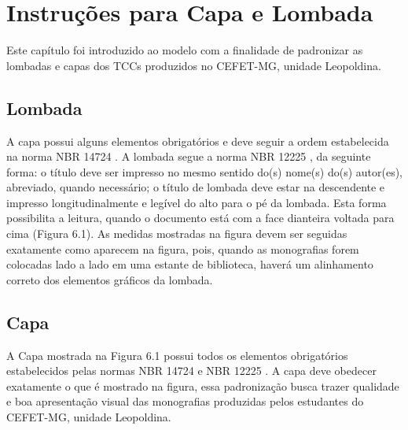 \documentclass[
        oneside,      %
        english,			
        brazil			 
        ]{configcefetmglpd}
\begin{document}
\chapter{Instruções para Capa e Lombada}
Este capítulo foi introduzido ao modelo com a finalidade de padronizar as lombadas e capas dos TCCs produzidos no CEFET-MG, unidade Leopoldina.

\section{Lombada}
A capa possui alguns elementos obrigatórios e deve seguir a ordem estabelecida na norma NBR 14724 \cite{bib:abnt14724}. A lombada segue a norma NBR 12225 \cite{bib:abnt1225}, da seguinte forma: o título deve ser impresso no mesmo sentido do(s) nome(s) do(s) autor(es), abreviado, quando necessário; o título de lombada deve estar na descendente e impresso longitudinalmente e legível do alto para o pé da lombada. Esta forma possibilita a leitura, quando o documento está com a face dianteira voltada para cima (Figura 6.1). As medidas mostradas na figura devem ser seguidas exatamente como aparecem na figura, pois, quando as monografias forem colocadas lado a lado em uma estante de biblioteca, haverá um alinhamento correto dos elementos gráficos da lombada.

\section{Capa}
A Capa mostrada na Figura 6.1 possui todos os elementos obrigatórios estabelecidos pelas normas NBR 14724 \cite{bib:abnt14724} e NBR 12225 \cite{bib:abnt1225}. A capa deve obedecer exatamente o que é mostrado na figura, essa padronização busca trazer qualidade e boa apresentação visual das monografias produzidas pelos estudantes do CEFET-MG, unidade Leopoldina.
\end{document}
